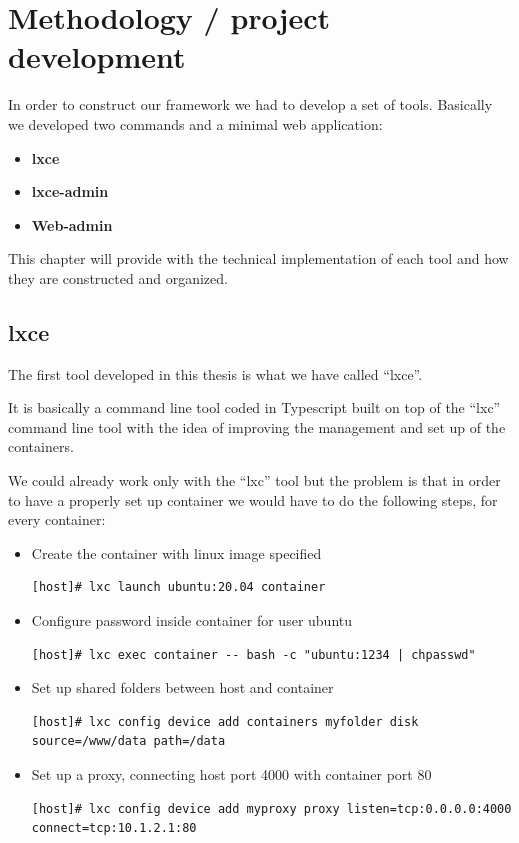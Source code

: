 \clearpage\section{Methodology / project development}

In order to construct our framework we had to develop a set of tools. Basically we developed two commands and a minimal web application:
\begin{itemize}
	\item{\textbf{lxce}}
	\item{\textbf{lxce-admin}}
	\item{\textbf{Web-admin}} 
\end{itemize}

This chapter will provide with the technical implementation of each tool and how they are constructed and organized. 

\subsection{lxce}
The first tool developed in this thesis is what we have called ``lxce''.

It is basically a command line tool coded in Typescript built on top of the ``lxc'' command line tool with the idea of improving the management and set up of the containers.

We could already work only with the ``lxc'' tool but the problem is that in order to have a properly set up container we would have to do the following steps, for every container:
\begin{itemize}
	\item{Create the container with linux image specified}
		\begin{verbatim}
[host]# lxc launch ubuntu:20.04 container
		\end{verbatim}
	\item{Configure password inside container for user ubuntu}
		\begin{verbatim}
[host]# lxc exec container -- bash -c "ubuntu:1234 | chpasswd"
		\end{verbatim}
	\item{Set up shared folders between host and container}
		\begin{verbatim}
[host]# lxc config device add containers myfolder disk source=/www/data path=/data
		\end{verbatim}
	\item{Set up a proxy, connecting host port 4000 with container port 80}
		\begin{verbatim}
[host]# lxc config device add myproxy proxy listen=tcp:0.0.0.0:4000 connect=tcp:10.1.2.1:80
		\end{verbatim}
\end{itemize}

